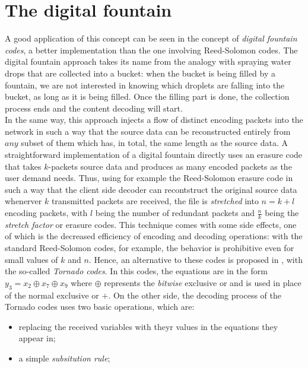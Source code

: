 \section{The digital fountain}
\label{sec:tornado}
A good application of this concept can be seen in the concept of \textit{digital fountain codes}, a better implementation than the one involving Reed-Solomon codes.\cite{Byers}
The digital fountain approach takes its name from the analogy with spraying water drops that are collected into a bucket: when the bucket is being filled by a fountain, we are not interested in knowing which droplets are falling into the bucket, as long as it is being filled. Once the filling part is done, the collection process ends and the content decoding will start. \cite{Lu}\\
In the same way, this approach injects a flow of distinct encoding packets into the network in such a way that the source data can be reconstructed entirely from $any$ subset of them which has, in total, the same length as the source data.
A straightforward implementation of a digital fountain directly uses an erasure code that takes $k$-packets source data and produces as many encoded packets as the user demand needs. Thus, using for example the Reed-Solomon erasure code in such a way that the client side decoder can recontstruct the original source data whenerver $k$ transmitted packets are received, the file is \textit{stretched} into $n = k+l$ encoding packets, with $l$ being the number of redundant packets and $\frac{n}{k}$ being the \textit{stretch factor} or erasure codes. This technique comes with some side effects, one of which is the decreased efficiency of encoding and decoding operations: with the standard Reed-Solomon codes, for example, the behavior is prohibitive even for small values of $k$ and $n$. Hence, an alternative to these codes is proposed in \cite{Byers}, with the so-called \textit{Tornado codes}. In this codes, the equations are in the form $y_3 = x_2 \oplus x_7 \oplus x_9$ where $\oplus$ represents the \textit{bitwise} exclusive or and is used in place of the normal exclusive or $+$. On the other side, the decoding process of the Tornado codes uses two basic operations, which are:
\begin{itemize}
  \item replacing the received variables with theyr values in the equations they appear in;
  \item a simple \textit{subsitution rule};
\end{itemize}

